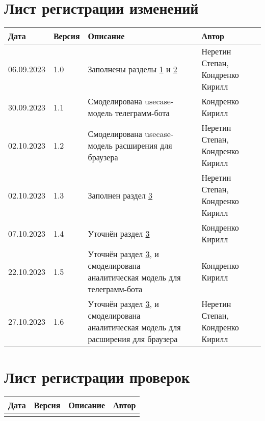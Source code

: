 \chapter*{Лист регистрации изменений}
	\begin{tabularx}{\textwidth}{
			| >{\centering\arraybackslash\hsize=2cm}X
			| >{\centering\arraybackslash\hsize=1.5cm}X
			| >{\centering\arraybackslash}X
			| >{\centering\arraybackslash\hsize=5cm}X
			|}
		\hline
		\textbf{Дата} & \textbf{Версия} & \textbf{Описание} & \textbf{Автор} \\\hline
		
		06.09.2023 & 1.0 & Заполнены разделы \hyperref[chapter1]{1} и \hyperref[chapter2]{2} & Неретин Степан, Кондренко Кирилл \\\hline
		
		30.09.2023 & 1.1 & Смоделирована usecase-модель телеграмм-бота & Кондренко Кирилл \\\hline
		
		02.10.2023 & 1.2 & Смоделирована usecase-модель расширения для браузера & Неретин Степан, Кондренко Кирилл \\\hline
		
		02.10.2023 & 1.3 & Заполнен раздел \hyperref[chapter3]{3} & Неретин Степан, Кондренко Кирилл \\\hline
		

		07.10.2023 & 1.4 & Уточнён раздел \hyperref[chapter3]{3} & Кондренко Кирилл \\\hline

		22.10.2023 & 1.5 & Уточнён раздел \hyperref[chapter3]{3}, и смоделирована аналитическая модель для телеграмм-бота & Кондренко Кирилл \\\hline
		
		27.10.2023 & 1.6 & Уточнён раздел \hyperref[chapter3]{3}, и смоделирована аналитическая модель для расширения для браузера & Неретин Степан, Кондренко Кирилл \\\hline
	\end{tabularx}
\chapter*{Лист регистрации проверок}
	\begin{tabularx}{\textwidth}{
			| >{\centering\arraybackslash\hsize=2cm}X
			| >{\centering\arraybackslash\hsize=1.5cm}X
			| >{\centering\arraybackslash}X
			| >{\centering\arraybackslash\hsize=5cm}X
			|}
		\hline
		\textbf{Дата} & \textbf{Версия} & \textbf{Описание} & \textbf{Автор} \\
		\hline
		&&& \\
		\hline
	\end{tabularx}

